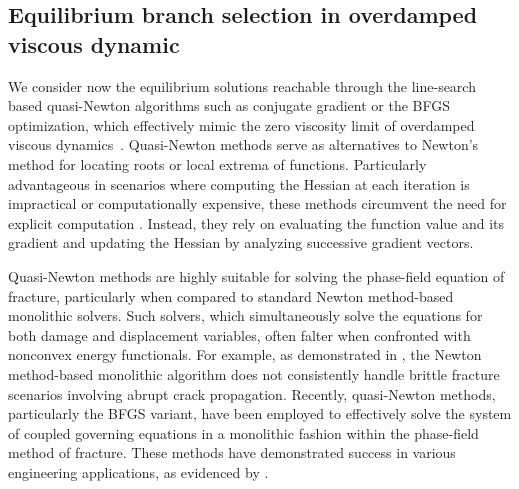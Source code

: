 \subsection{Equilibrium branch selection in overdamped viscous dynamic}
We consider now the equilibrium solutions reachable through the line-search based quasi-Newton algorithms such as  conjugate gradient or the BFGS optimization, which effectively  mimic the zero viscosity limit of overdamped viscous dynamics~\cite{SALMAN2012219}. Quasi-Newton methods serve as alternatives to Newton's method for locating roots or local extrema of functions. Particularly advantageous in scenarios where computing the Hessian at each iteration is impractical or computationally expensive, these methods circumvent the need for explicit computation . Instead, they rely on evaluating the function value and its gradient and updating the Hessian by analyzing successive gradient vectors.

Quasi-Newton methods are highly suitable for solving the phase-field equation of fracture, particularly when compared to standard Newton method-based monolithic solvers. Such solvers, which simultaneously  solve the equations for both damage and displacement variables, often falter when confronted with nonconvex energy functionals. For example, as demonstrated in \cite{Wick2017-bo}, the Newton method-based monolithic algorithm does not consistently handle brittle fracture scenarios involving abrupt crack propagation. Recently, quasi-Newton methods, particularly the BFGS variant, have been employed to effectively solve the system of coupled governing equations in a monolithic fashion within the phase-field method of fracture. These methods have demonstrated success in various engineering applications, as evidenced by \cite{Kristensen2020-zy,Wu2020-qk,Salman2021-mn,Liu2022-ix}.

